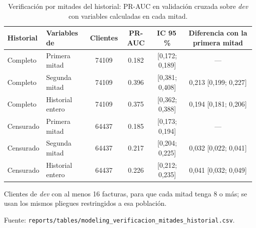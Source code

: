 \begin{table}[htbp]
  \centering
  \small
  \caption{Verificación por mitades del historial: PR-AUC en validación cruzada sobre \textit{dev} con variables calculadas en cada mitad.}
  \label{tab:mitades}
  \begin{threeparttable}
    \begin{tabular}{l l S[table-format=5.0] S[table-format=1.3] c c}
      \toprule
      {Historial} & {Variables de} & {Clientes} & {PR-AUC} & {IC 95\,\%} & {Diferencia con la primera mitad} \\
      \midrule
      Completo & Primera mitad & 74109 & 0.182 & {[0,172; 0,189]} & {---} \\
      Completo & Segunda mitad & 74109 & 0.396 & {[0,381; 0,408]} & {0,213 [0,199; 0,227]} \\
      Completo & Historial entero & 74109 & 0.375 & {[0,362; 0,388]} & {0,194 [0,181; 0,206]} \\
      Censurado & Primera mitad & 64437 & 0.185 & {[0,173; 0,194]} & {---} \\
      Censurado & Segunda mitad & 64437 & 0.217 & {[0,204; 0,225]} & {0,032 [0,022; 0,041]} \\
      Censurado & Historial entero & 64437 & 0.226 & {[0,212; 0,235]} & {0,041 [0,032; 0,049]} \\
      \bottomrule
    \end{tabular}
    \begin{tablenotes}
      \footnotesize
      \item Clientes de \textit{dev} con al menos 16 facturas, para que cada mitad tenga 8 o más; se usan los mismos pliegues restringidos a esa población.
      \item Fuente: \texttt{reports/tables/modeling\_verificacion\_mitades\_historial.csv}.
    \end{tablenotes}
  \end{threeparttable}
\end{table}
